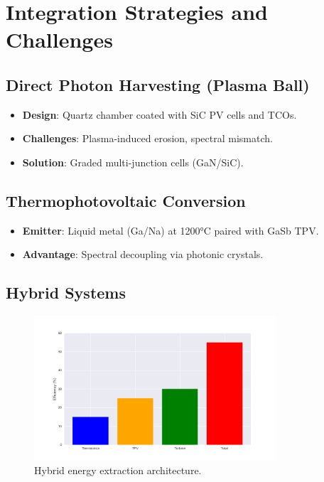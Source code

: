 \documentclass{article}
\begin{document}
\section{Integration Strategies and Challenges}
\label{sec:integration}

\subsection{Direct Photon Harvesting (Plasma Ball)}
\begin{itemize}
    \item \textbf{Design}: Quartz chamber coated with SiC PV cells and TCOs.
    \item \textbf{Challenges}: Plasma-induced erosion, spectral mismatch.
    \item \textbf{Solution}: Graded multi-junction cells (GaN/SiC).
\end{itemize}

\subsection{Thermophotovoltaic Conversion}
\begin{itemize}
    \item \textbf{Emitter}: Liquid metal (Ga/Na) at 1200°C paired with GaSb TPV.
    \item \textbf{Advantage}: Spectral decoupling via photonic crystals.
\end{itemize}

\subsection{Hybrid Systems}
\begin{figure}[ht]
    \centering
    \includegraphics[width=0.8\textwidth]{hybrid.png}
    \caption{Hybrid energy extraction architecture.}
    \label{fig:hybrid}
\end{figure}
\end{document}

